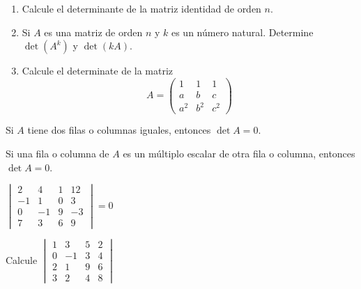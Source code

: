 \begin{ejer}
\begin{enumerate}
\item Calcule el determinante de la matriz identidad de orden $n$. 
    \item Si $A$ es una matriz de orden $n$ y $k$ es un n\'umero natural. Determine $\det(A^k)$ y $\det(kA)$.
    \item Calcule el determinate de la matriz
    \[A=\begin{pmatrix} 1 & 1 & 1 \\ a & b & c \\ a^2 & b^2 & c^2 \end{pmatrix}\]
    \vspace*{0.5cm}
\end{enumerate}
\end{ejer}



\begin{rmk}
Si $A$ tiene dos filas o columnas iguales, entonces $\det A=0$.
\end{rmk}


\begin{rmk}
Si una fila o columna de $A$ es un múltiplo escalar de otra fila o columna, entonces $\det A = 0$.
\end{rmk}

\begin{ejem}
    $\begin{vmatrix} 2 & 4 & 1 & 12 \\ -1 & 1 & 0 & 3 \\ 0 & -1 & 9 & -3 \\ 7 & 3 & 6 & 9 \end{vmatrix} = 0$
\end{ejem}




\begin{ejem}
    Calcule $\begin{vmatrix} 1 & 3 & 5 & 2 \\ 0 & -1 & 3 & 4 \\ 2 & 1 & 9 & 6 \\ 3 & 2 & 4 & 8 \end{vmatrix}$
\end{ejem}

